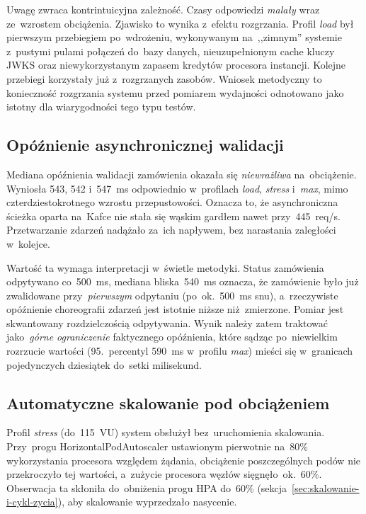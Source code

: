 Uwagę zwraca kontrintuicyjna zależność. Czasy odpowiedzi \emph{malały} wraz ze~wzrostem obciążenia. Zjawisko to wynika
z~efektu rozgrzania. Profil \emph{load} był pierwszym przebiegiem po~wdrożeniu, wykonywanym na~,,zimnym''
systemie z~pustymi pulami połączeń do~bazy danych, nieuzupełnionym cache kluczy JWKS oraz niewykorzystanym
zapasem kredytów procesora instancji. Kolejne przebiegi korzystały już z~rozgrzanych zasobów.
Wniosek metodyczny to konieczność rozgrzania systemu przed pomiarem wydajności odnotowano jako istotny dla
wiarygodności tego typu testów.

\subsection{Opóźnienie asynchronicznej walidacji}
\label{subsec:opoznienie-walidacji}

Mediana opóźnienia walidacji zamówienia okazała się \emph{niewrażliwa} na~obciążenie. Wyniosła 543, 542 i~547~ms
odpowiednio w~profilach \emph{load}, \emph{stress} i~\emph{max}, mimo czterdziestokrotnego wzrostu przepustowości.
Oznacza to, że asynchroniczna ścieżka oparta na~Kafce nie stała się wąskim gardłem nawet przy~445~req/s.
Przetwarzanie zdarzeń nadążało za~ich napływem, bez narastania zaległości w~kolejce.

Wartość ta wymaga interpretacji w~świetle metodyki. Status zamówienia odpytywano co~500~ms, mediana
bliska~540~ms oznacza, że zamówienie było już zwalidowane przy~\emph{pierwszym} odpytaniu (po~ok.~500~ms snu),
a~rzeczywiste opóźnienie choreografii zdarzeń jest istotnie niższe niż~zmierzone. Pomiar jest skwantowany
rozdzielczością odpytywania. Wynik należy zatem traktować jako~\emph{górne ograniczenie} faktycznego opóźnienia,
które sądząc po~niewielkim rozrzucie wartości (95.~percentyl 590~ms w~profilu \emph{max}) mieści się
w~granicach pojedynczych dziesiątek do~setki milisekund.

\subsection{Automatyczne skalowanie pod obciążeniem}
\label{subsec:skalowanie-pod-obciazeniem}

Profil \emph{stress} (do~115~VU) system obsłużył bez~uruchomienia skalowania. Przy~progu HorizontalPodAutoscaler
ustawionym pierwotnie na~80\% wykorzystania procesora względem żądania, obciążenie poszczególnych podów nie
przekroczyło tej wartości, a~zużycie procesora węzłów sięgnęło~ok.~60\%. Obserwacja ta skłoniła do~obniżenia progu
HPA do~60\% (sekcja~\ref{sec:skalowanie-i-cykl-zycia}), aby skalowanie wyprzedzało nasycenie.

